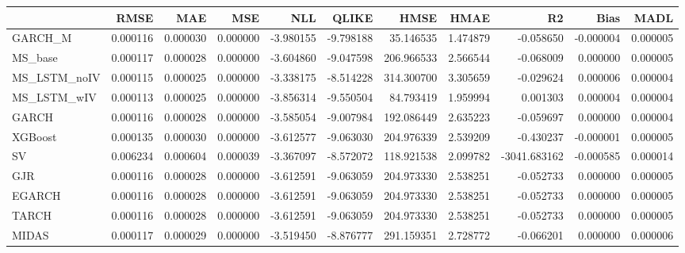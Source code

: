 \begin{tabular}{lrrrrrrrrrr}
\toprule
 & RMSE & MAE & MSE & NLL & QLIKE & HMSE & HMAE & R2 & Bias & MADL \\
\midrule
GARCH_M & 0.000116 & 0.000030 & 0.000000 & -3.980155 & -9.798188 & 35.146535 & 1.474879 & -0.058650 & -0.000004 & 0.000005 \\
MS_base & 0.000117 & 0.000028 & 0.000000 & -3.604860 & -9.047598 & 206.966533 & 2.566544 & -0.068009 & 0.000000 & 0.000005 \\
MS_LSTM_noIV & 0.000115 & 0.000025 & 0.000000 & -3.338175 & -8.514228 & 314.300700 & 3.305659 & -0.029624 & 0.000006 & 0.000004 \\
MS_LSTM_wIV & 0.000113 & 0.000025 & 0.000000 & -3.856314 & -9.550504 & 84.793419 & 1.959994 & 0.001303 & 0.000004 & 0.000004 \\
GARCH & 0.000116 & 0.000028 & 0.000000 & -3.585054 & -9.007984 & 192.086449 & 2.635223 & -0.059697 & 0.000000 & 0.000004 \\
XGBoost & 0.000135 & 0.000030 & 0.000000 & -3.612577 & -9.063030 & 204.976339 & 2.539209 & -0.430237 & -0.000001 & 0.000005 \\
SV & 0.006234 & 0.000604 & 0.000039 & -3.367097 & -8.572072 & 118.921538 & 2.099782 & -3041.683162 & -0.000585 & 0.000014 \\
GJR & 0.000116 & 0.000028 & 0.000000 & -3.612591 & -9.063059 & 204.973330 & 2.538251 & -0.052733 & 0.000000 & 0.000005 \\
EGARCH & 0.000116 & 0.000028 & 0.000000 & -3.612591 & -9.063059 & 204.973330 & 2.538251 & -0.052733 & 0.000000 & 0.000005 \\
TARCH & 0.000116 & 0.000028 & 0.000000 & -3.612591 & -9.063059 & 204.973330 & 2.538251 & -0.052733 & 0.000000 & 0.000005 \\
MIDAS & 0.000117 & 0.000029 & 0.000000 & -3.519450 & -8.876777 & 291.159351 & 2.728772 & -0.066201 & 0.000000 & 0.000006 \\
\bottomrule
\end{tabular}
